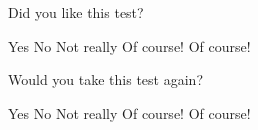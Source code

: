 \documentclass[addpoints]{exam}
\begin{document}
\begin{questions}

\newpage


\newpage


\question[3]
Did you like this test?
\begin{checkboxes}
\choice Yes
\choice No
\choice Not really
\choice Of course!
\CorrectChoice Of course!
\end{checkboxes}

\question[10]
Would you take this test again?
\begin{oneparcheckboxes}
\choice Yes
\choice No
\choice Not really
\choice Of course!
\CorrectChoice Of course!
\end{oneparcheckboxes}


\end{questions}
\end{document}
